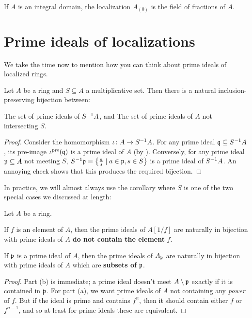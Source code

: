 \begin{example}
	If $A$ is an integral domain,
	the localization $A_{(0)}$
	is the field of fractions of $A$.
\end{example}


\section{Prime ideals of localizations}
We take the time now to mention how you can
think about prime ideals of localized rings.
\begin{proposition}
	Let $A$ be a ring and $S \subseteq A$ a multiplicative set.
	Then there is a natural inclusion-preserving bijection between:
	\begin{itemize}
		\ii The set of prime ideals of $S^{-1} A$, and
		\ii The set of prime ideals of $A$ not intersecting $S$.
	\end{itemize}
\end{proposition}
\begin{proof}
	Consider the homomorphism $\iota \colon A \to S^{-1} A$.
	For any prime ideal $\mathfrak q \subseteq S^{-1} A$,
	its pre-image $\iota^{\text{pre}}(\mathfrak q)$ is a prime ideal of $A$
	(by ).
	Conversely, for any prime ideal $\mathfrak p \subseteq A$
	not meeting $S$,
	$S^{-1} \mathfrak p = \left\{ \frac{a}{s} \mid a \in \mathfrak p, s \in S \right\}$
	is a prime ideal of $S^{-1} A$.
	An annoying check shows that this produces the required bijection.
\end{proof}
In practice, we will almost always use the corollary
where $S$ is one of the two special cases we discussed at length:
\begin{corollary}
	Let $A$ be a ring.
	\begin{enumerate}[(a)]
		\ii If $f$ is an element of $A$,
		then the prime ideals of $A[1/f]$ are naturally
		in bijection with prime ideals of $A$
		\textbf{do not contain the element} $f$.

		\ii If $\mathfrak p$ is a prime ideal of $A$,
		then the prime ideals of $A_\mathfrak p$ are naturally
		in bijection with prime ideals of $A$
		which are \textbf{subsets of} $\mathfrak p$.
	\end{enumerate}
\end{corollary}
\begin{proof}
	Part (b) is immediate; a prime ideal doesn't meet $A \setminus \mathfrak p$
	exactly if it is contained in $\mathfrak p$.
	For part (a), we want prime ideals of $A$ not containing
	any \emph{power} of $f$.
	But if the ideal is prime and contains $f^n$,
	then it should contain either $f$ or $f^{n-1}$,
	and so at least for prime ideals these are equivalent.
\end{proof}
